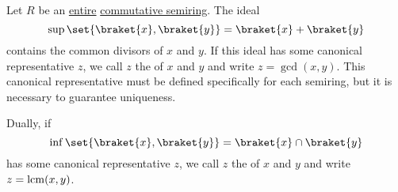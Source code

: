 \begin{definition}\label{def:gcd_and_lcm}\mimprovised
  Let \( R \) be an \hyperref[def:divisibility/zero]{entire} \hyperref[def:semiring/commutative]{commutative semiring}. The ideal
  \begin{equation*}
    \sup\set{ \braket{x}, \braket{y} } = \braket{x} + \braket{y}
  \end{equation*}
  contains the common divisors of \( x \) and \( y \). If this ideal has some canonical representative \( z \), we call \( z \) the  of \( x \) and \( y \) and write \( z = \gcd(x, y) \). This canonical representative must be defined specifically for each semiring, but it is necessary to guarantee uniqueness.

  Dually, if
  \begin{equation*}
    \inf\set{ \braket{x}, \braket{y} } = \braket{x} \cap \braket{y}
  \end{equation*}
  has some canonical representative \( z \), we call \( z \) the  of \( x \) and \( y \) and write \( z = \operatorname{lcm}(x, y) \).
\end{definition}


